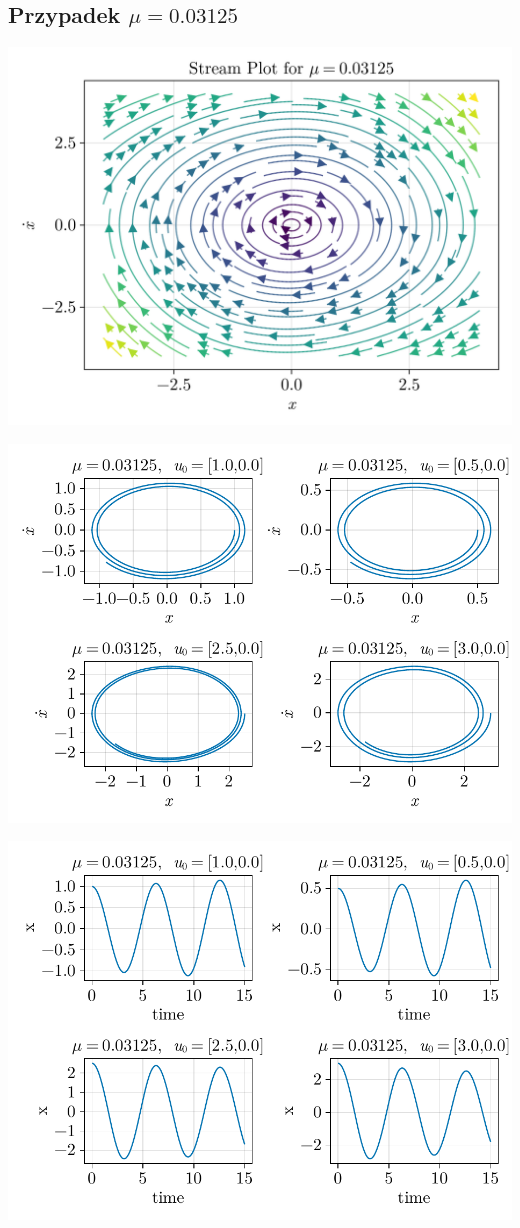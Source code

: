 \clearpage

%
%
\subsection{Przypadek $\mu = 0.03125$}
\includegraphics[width=\textwidth]{out/stream_02.png}

\includegraphics[width=\textwidth]{out/phase_02.pdf}

\includegraphics[width=\textwidth]{out/xfromt_02.pdf}

